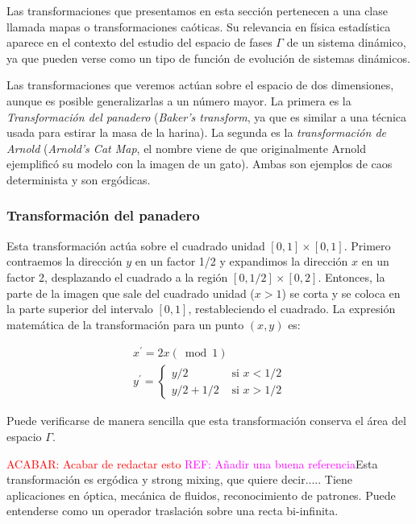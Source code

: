 \documentclass[11pt, a4paper]{article} %
\theoremstyle{named}
\begin{document}
        Las transformaciones que presentamos en esta sección pertenecen a una clase llamada mapas o transformaciones caóticas. Su relevancia en física estadística aparece en el contexto del estudio del espacio de fases $\Gamma$ de un sistema dinámico, ya que pueden verse como un tipo de función de evolución de sistemas dinámicos.

        Las transformaciones que veremos actúan sobre el espacio de dos dimensiones, aunque es posible generalizarlas a un número mayor. La primera es la \textit{Transformación del panadero} (\textit{Baker's transform}, ya que es similar a una técnica usada para estirar la masa de la harina). La segunda es la \textit{transformación de Arnold} (\textit{Arnold's Cat Map}, el nombre viene de que originalmente Arnold ejemplificó su modelo con la imagen de un gato). Ambas son ejemplos de caos determinista y son ergódicas.

        \subsubsection{Transformación del panadero}\label{sec:panadero}

            Esta transformación actúa sobre el cuadrado unidad $[0,1] \times [0,1]$. Primero contraemos la dirección $y$ en un factor 1/2 y expandimos la dirección $x$ en un factor 2, desplazando el cuadrado a la región $[0,1/2] \times [0,2]$. Entonces, la parte de la imagen que sale del cuadrado unidad ($x >1$) se corta y se coloca en la parte superior del intervalo $[0,1]$, restableciendo el cuadrado. La expresión matemática de la transformación para un punto $(x,y)$ es:

            $$
            \begin{array}{l}
            {x^{\prime}=2 x(\bmod 1)} \\
            {y^{\prime}=\left\{\begin{array}{ll}
            {y / 2} & {\text { si } x<1 / 2} \\
            {y / 2+1 / 2} & {\text { si } x>1 / 2}
            \end{array}\right.}
            \end{array}
            $$

            Puede verificarse de manera sencilla que esta transformación conserva el área del espacio $\Gamma$.

            \textcolor{red}{ACABAR: Acabar de redactar esto} \textcolor{magenta}{REF: Añadir una buena referencia}Esta transformación es ergódica y strong mixing, que quiere decir.....
            Tiene aplicaciones en óptica, mecánica de fluidos, reconocimiento de patrones.
            Puede entenderse como un operador traslación sobre una recta bi-infinita.
\end{document}
